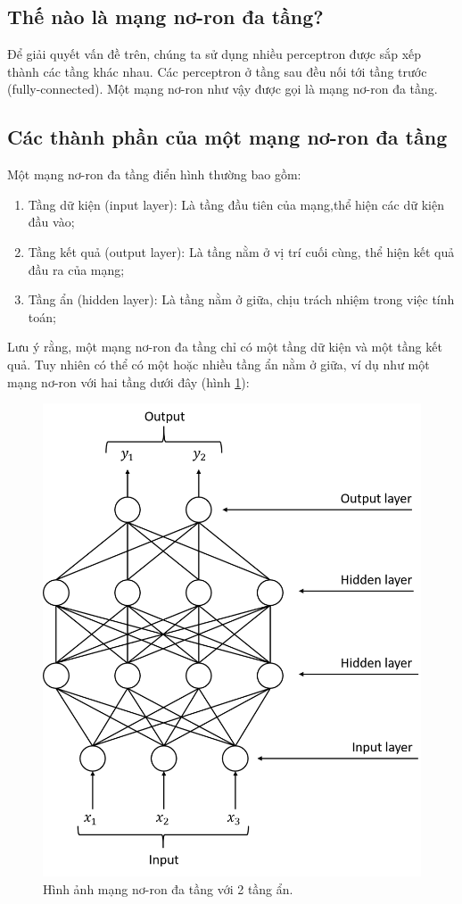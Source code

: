 \subsection{Thế nào là mạng nơ-ron đa tầng?}
\label{subsec:whatIsMLP}
Để giải quyết vấn đề trên, chúng ta sử dụng nhiều perceptron được sắp xếp thành các tầng khác nhau. Các perceptron ở tầng sau đều nối tới tầng trước (fully-connected). Một mạng nơ-ron như vậy được gọi là mạng nơ-ron đa tầng.

\subsection{Các thành phần của một mạng nơ-ron đa tầng}
\label{subsec:structureOfMLP}
Một mạng nơ-ron đa tầng điển hình thường bao gồm:
\begin{enumerate}
\item Tầng dữ kiện (input layer): Là tầng đầu tiên của mạng,thể hiện các dữ kiện đầu vào;
\item Tầng kết quả (output layer): Là tầng nằm ở vị trí cuối cùng, thể hiện kết quả đầu ra của mạng;
\item Tầng ẩn (hidden layer): Là tầng nằm ở giữa, chịu trách nhiệm trong việc tính toán;
\end{enumerate}

Lưu ý rằng, một mạng nơ-ron đa tầng chỉ có một tầng dữ kiện và một tầng kết quả. Tuy nhiên có thể có một hoặc nhiều tầng ẩn nằm ở giữa, ví dụ như một mạng nơ-ron với hai tầng dưới đây (hình \ref{fig:MLP2HiddenLayer}):

\begin{figure}[h]
	\centering
		\includegraphics[width=0.5\columnwidth]{books/artificial-neural-network/chapter01/figure/Picture3.png}
		\centering
	\caption{Hình ảnh mạng nơ-ron đa tầng với 2 tầng ẩn.}
	\label{fig:MLP2HiddenLayer}
\end{figure}


